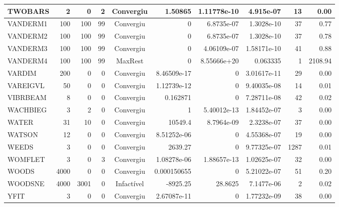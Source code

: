 \begin{center}
\begin{longtable}{|l|r|r|r|c|r|r|r|r|r|}
 TWOBARS &      2 &      0 &      2 & Convergiu  &     1.50865 &    1.11778e-10 &   4.915e-07 &     13 &    0.00 \\ \hline
VANDERM1 &    100 &    100 &     99 & Convergiu  &           0 &     6.8735e-07 &  1.3028e-10 &     37 &    0.77 \\ \hline
VANDERM2 &    100 &    100 &     99 & Convergiu  &           0 &     6.8735e-07 &  1.3028e-10 &     37 &    0.78 \\ \hline
VANDERM3 &    100 &    100 &     99 & Convergiu  &           0 &    4.06109e-07 & 1.58171e-10 &     41 &    0.88 \\ \hline
VANDERM4 &    100 &    100 &     99 & MaxRest    &           0 &    8.55666e+20 &    0.063335 &      1 & 2108.94 \\ \hline
  VARDIM &    200 &      0 &      0 & Convergiu  & 8.46509e-17 &              0 & 3.01617e-11 &     29 &    0.00 \\ \hline
VAREIGVL &     50 &      0 &      0 & Convergiu  & 1.12739e-12 &              0 & 9.40035e-08 &     14 &    0.01 \\ \hline
VIBRBEAM &      8 &      0 &      0 & Convergiu  &    0.162871 &              0 & 7.28711e-08 &     42 &    0.02 \\ \hline
WACHBIEG &      3 &      2 &      0 & Convergiu  &           1 &    5.40012e-13 & 1.84452e-07 &      3 &    0.00 \\ \hline
   WATER &     31 &     10 &      0 & Convergiu  &     10549.4 &     8.7964e-09 &  2.3238e-07 &     37 &    0.00 \\ \hline
  WATSON &     12 &      0 &      0 & Convergiu  & 8.51252e-06 &              0 & 4.55368e-07 &     19 &    0.00 \\ \hline
   WEEDS &      3 &      0 &      0 & Convergiu  &     2639.27 &              0 & 9.77325e-07 &   1287 &    0.01 \\ \hline
 WOMFLET &      3 &      0 &      3 & Convergiu  & 1.08278e-06 &    1.88657e-13 & 1.02625e-07 &     32 &    0.00 \\ \hline
   WOODS &   4000 &      0 &      0 & Convergiu  & 0.000150655 &              0 & 5.21022e-07 &     51 &    0.20 \\ \hline
 WOODSNE &   4000 &   3001 &      0 & Infactível &    -8925.25 &        28.8625 &  7.1477e-06 &      2 &    0.02 \\ \hline
    YFIT &      3 &      0 &      0 & Convergiu  & 2.67087e-11 &              0 & 1.77232e-09 &     38 &    0.00 \\ \hline

\end{longtable}
\end{center}
